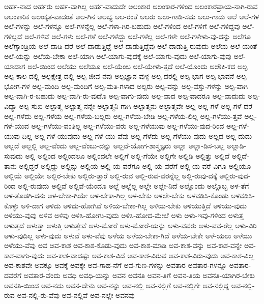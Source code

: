 {ಅರ್ಹ-ನಾದ
ಅರ್ಹರು
ಅರ್ಹ-ವಾಗಿಲ್ಲ
ಅರ್ಹ-ವಾದುದೇ
ಅಲಂಕಾರ
ಅಲಂಕಾರ-ಗಳಿಂದ
ಅಲಂಕಾರಪ್ರಾಯ-ನಾಗಿ-ರುವ
ಅಲಂಕಾರಿಕ
ಅಲಂಕೃತ-ವಾದಂತೆ
ಅಲ-ಗಿನ
ಅಲಭ್ಯ
ಅಲ-ರಂತೆ
ಅಲರು
ಅಲು-ಗಾಡಿ-ಸದು
ಅಲು-ಗಾಡು
ಅಲೆ
ಅಲೆ-ಗಳ
ಅಲೆ-ಗಳನ್ನು
ಅಲೆ-ಗಳನ್ನೂ
ಅಲೆ-ಗಳನ್ನೆಲ್ಲ
ಅಲೆ-ಗಳಾ-ಗಿರ-ಬಹುದು
ಅಲೆ-ಗಳಿಂದ
ಅಲೆ-ಗಳಿಗೆ
ಅಲೆ-ಗಳಿದ್ದವು
ಅಲೆ-ಗಳಿಲ್ಲದೆ
ಅಲೆ-ಗಳಿವೆ
ಅಲೆ-ಗಳು
ಅಲೆ-ಗಳೆ
ಅಲೆ-ಗಳೆದ್ದು
ಅಲೆ-ಗಳೆಲ್ಲ
ಅಲೆ-ಗಳೇ
ಅಲೆ-ಗಳೇಳು-ವು-ದನ್ನು
ಅಲೆಗೂ
ಅಲೆಗ್ಸಾಂಡ್ರಿಯ
ಅಲೆ-ದಾಡಿ-ದರೆ
ಅಲೆ-ದಾಡುತ್ತಿದ್ದೆ
ಅಲೆ-ದಾಡುತ್ತಿದ್ದೆವು
ಅಲೆ-ದಾಡುತ್ತಿ-ರುವುದು
ಅಲೆಯ
ಅಲೆ-ಯಂತೆ
ಅಲೆ-ಯನ್ನು
ಅಲೆಯ-ಬೇಕಾ
ಅಲೆ-ಯಾಗಿ
ಅಲೆ-ಯಾಗು-ವುದಕ್ಕೆ
ಅಲೆ-ಯಾಗು-ವುದು
ಅಲೆ-ಯಾಗು-ವುವು
ಅಲೆ-ಯಾದಾಗ
ಅಲೆ-ಯಿಂದ
ಅಲೆಯು
ಅಲೆಯೂ
ಅಲೆ-ಯೆಂಬ
ಅಲೆ-ಯೇಳು-ತ್ತದೆ
ಅಲೆ-ಯೊಂದು
ಅಲೌಕಿ-ಕದ
ಅಲ್ಪ
ಅಲ್ಪ-ಕಾಲ-ದಲ್ಲಿ
ಅಲ್ಪಕ್ಷೇತ್ರ-ದಲ್ಲಿ
ಅಲ್ಪ-ಜೀವ-ನವು
ಅಲ್ಪಜ್ಞಾನ-ವುಳ್ಳ
ಅಲ್ಪ-ದರಲ್ಲಿ
ಅಲ್ಪ-ಭಾಗ
ಅಲ್ಪ-ಭಾವನೆ
ಅಲ್ಪ-ಭೋಗ-ಗಳ
ಅಲ್ಪ-ಮಂದಿ
ಅಲ್ಪ-ಮಂದಿಗೆ
ಅಲ್ಪ-ಮತಿ-ಗಳಾದ
ಅಲ್ಪರು
ಅಲ್ಪ-ವನ್ನು
ಅಲ್ಪ-ವಸ್ತು-ಗಳನ್ನು
ಅಲ್ಪ-ವಾಗಿ
ಅಲ್ಪ-ವಾಗಿ-ರ-ಬಹುದು
ಅಲ್ಪ-ವಾಗಿ-ರು-ವುದೊ
ಅಲ್ಪ-ವಾಗು-ವುದು
ಅಲ್ಪ-ವಾದ
ಅಲ್ಪ-ವಾದರೂ
ಅಲ್ಪ-ವಾದುದು
ಅಲ್ಪ-ವಿದ್ಯಾ
ಅಲ್ಪ-ಸುಖ
ಅಲ್ಪಾತ್ಮ
ಅಲ್ಪಾತ್ಮ-ನನ್ನೇ
ಅಲ್ಪಾತ್ಮನಿ-ಗಾಗಿ
ಅಲ್ಪಾತ್ಮನು
ಅಲ್ಪಾತ್ಮವೇ
ಅಲ್ಲ
ಅಲ್ಲ-ಗಳೆ
ಅಲ್ಲ-ಗಳೆ-ದರೆ
ಅಲ್ಲ-ಗಳೆದು
ಅಲ್ಲ-ಗಳೆಯ
ಅಲ್ಲ-ಗಳೆಯ-ಬಲ್ಲರು
ಅಲ್ಲ-ಗಳೆಯ-ಬೇಡಿ
ಅಲ್ಲ-ಗಳೆಯ-ಲಿಲ್ಲ
ಅಲ್ಲ-ಗಳೆಯು-ತ್ತವೆ
ಅಲ್ಲ-ಗಳೆ-ಯುವ
ಅಲ್ಲ-ಗಳೆಯು-ವಂತಿಲ್ಲ
ಅಲ್ಲ-ಗಳೆಯು-ವರು
ಅಲ್ಲ-ಗಳೆಯುವು
ಅಲ್ಲ-ಗಳೆಯು-ವುದ-ರಿಂದ
ಅಲ್ಲ-ಗಳೆ-ಯುವು-ದಿಲ್ಲ
ಅಲ್ಲ-ಗಳೆ-ಯುವುದು
ಅಲ್ಲ-ಗಳೆ-ಯು-ವೆವು
ಅಲ್ಲ-ಗೆಳೆದು
ಅಲ್ಲ-ಗೆಳೆಯು-ವುದು
ಅಲ್ಲದ
ಅಲ್ಲ-ದುದು
ಅಲ್ಲದೆ
ಅಲ್ಲಲ್ಲಿ
ಅಲ್ಲ-ವೆಂದು
ಅಲ್ಲ-ವೆಂಬು-ದನ್ನು
ಅಲ್ಲವೆ-ಯೋಗ-ಶಾಸ್ತ್ರಜ್ಞರು
ಅಲ್ಲಾ
ಅಲ್ಲಾ-ಡಿಸ-ಬಲ್ಲ
ಅಲ್ಲಾಡಿ-ಸುವುದು
ಅಲ್ಲಿ
ಅಲ್ಲಿಂದ
ಅಲ್ಲಿಂದಲೂ
ಅಲ್ಲಿಂದಲೇ
ಅಲ್ಲಿಗೆ
ಅಲ್ಲಿ-ಗೆಯೇ
ಅಲ್ಲಿಗೇ
ಅಲ್ಲಿಡಿ
ಅಲ್ಲಿತ್ತು
ಅಲ್ಲಿದೆ
ಅಲ್ಲಿದೆ-ತಾನು
ಅಲ್ಲಿದ್ದರೆ
ಅಲ್ಲಿದ್ದು
ಅಲ್ಲಿನ್ನು
ಅಲ್ಲಿಯ
ಅಲ್ಲಿ-ಯ-ವರೆಗೂ
ಅಲ್ಲಿ-ಯ-ವರೆಗೆ
ಅಲ್ಲಿ-ಯ-ವರೆ-ವಿಗೂ
ಅಲ್ಲಿಯೂ
ಅಲ್ಲಿಯೆ
ಅಲ್ಲಿಯೇ
ಅಲ್ಲಿರ-ಬೇಕು
ಅಲ್ಲಿರು-ತ್ತಾರೆ
ಅಲ್ಲಿ-ರುವ
ಅಲ್ಲಿ-ರುವ-ವರನ್ನೆಲ್ಲ
ಅಲ್ಲಿ-ರುವು-ದಕ್ಕೆ
ಅಲ್ಲಿರು-ವುದ-ರಿಂದ
ಅಲ್ಲಿ-ರುವುದು
ಅಲ್ಲಿವೆ
ಅಲ್ಲಿವೆ-ಯೆಂದೂ
ಅಲ್ಲೆ
ಅಲ್ಲೆಲ್ಲ
ಅಲ್ಲೇ
ಅಲ್ಲೇ-ನಿದೆ
ಅಲ್ಲೊಂದು
ಅಲ್ಲೊಬ್ಬ
ಅಳ-ತೆಗೆ
ಅಳ-ತೊಡಗಿ-ದನು
ಅಳ-ಬೇಕಾ-ಗಿಯೇ
ಅಳ-ಬೇಕಾ-ಗಿಲ್ಲ
ಅಳ-ಬೇಕು
ಅಳಲೇ-ಬೇಕು
ಅಳವಡಿಸಿ-ಕೊಂಡು
ಅಳವಡಿಸಿ-ಕೊಳ್ಳು
ಅಳಿ-ದಾಗ
ಅಳಿದು
ಅಳಿದು-ಹೋಗಿವೆ
ಅಳಿಯ-ಬೇಕಾ-ಗಿಲ್ಲ
ಅಳಿಯ-ಬೇಕು
ಅಳಿಯುತ್ತಿದೆ
ಅಳಿಯು-ವುದು
ಅಳಿಯು-ವುವು
ಅಳಿವ
ಅಳಿವು
ಅಳಿಸಿ-ಹೋಗು-ವುದು
ಅಳಿಸಿ-ಹೋದ-ಮೇಲೆ
ಅಳು
ಅಳು-ಇವು-ಗಳಿಂದ
ಅಳುತ್ತ
ಅಳುತ್ತದೆ
ಅಳುತ್ತಾ
ಅಳುತ್ತಿ
ಅಳುತ್ತೇವೆ
ಅಳು-ಮೋರೆ
ಅಳು-ಮೋರೆ-ಯನ್ನು
ಅಳು-ವವರು
ಅಳು-ವವ-ರೆಲ್ಲ
ಅಳು-ವಿರಿ
ಅಳು-ವುದಿಲ್ಲ
ಅಳು-ವುದು
ಅಳುವೆ
ಅಳು-ವೆವು
ಅಳೆಯ
ಅಳೆಯ-ಬೇಕಾ-ಗಿದೆ
ಅಳೆಯ-ಬೇಕೇ
ಅಳೆ-ಯಲು
ಅಳೆಯು
ಅಳೆಯು-ವೆವು
ಅವ
ಅವ-ಕಾಶ
ಅವ-ಕಾಶ-ಕೊಡು-ವುದು
ಅವ-ಕಾಶ-ಮಾಡಿ
ಅವ-ಕಾಶ-ವನ್ನು
ಅವ-ಕಾಶ-ವನ್ನೇ
ಅವ-ಕಾಶ-ವಾಗು-ವುದು
ಅವ-ಕಾಶ-ವಾದಷ್ಟು
ಅವ-ಕಾಶ-ವಿದೆ
ಅವ-ಕಾಶ-ವಿರುವ
ಅವ-ಕಾಶ-ವಿರು-ವುದು
ಅವ-ಕಾಶ-ವಿಲ್ಲ
ಅವ-ಕಾಶವೇ
ಅವಕ್ಕೂ
ಅವಕ್ಕೆ
ಅವಕ್ಕೇ
ಅವ-ಗಾಹ-ನೆಗೆ
ಅವ-ಗುಣ-ಗಳನ್ನು
ಅವತಾರ
ಅವತಾರ-ಗಳನ್ನೂ
ಅವತಾರ-ದವರೆಗೆ
ಅವತಾರ-ವೆಂದು
ಅವಧಿ
ಅವಧಿ-ಯನ್ನು
ಅವನ
ಅವನತಿ
ಅವನ-ತಿಗೆ
ಅವನ-ತಿಯ
ಅವನತಿ-ಯಾಗಿರ-ಬೇಕು
ಅವನತಿ-ಯಿಂದ
ಅವ-ನದು
ಅವನ-ದೇನು
ಅವ-ನನ್ನು
ಅವ-ನಲ್ಲಿ
ಅವ-ನಲ್ಲಿಗೆ
ಅವ-ನಲ್ಲಿಗೇ
ಅವ-ನಲ್ಲಿದ್ದ
ಅವ-ನಲ್ಲಿ-ರುವ
ಅವ-ನಲ್ಲಿ-ರು-ವೆವು
ಅವ-ನಲ್ಲಿವೆ
ಅವ-ನಲ್ಲೇ
ಅವನವು
}
